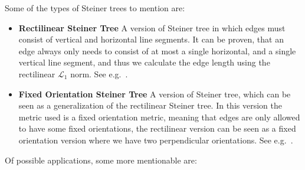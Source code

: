 Some of the types of Steiner trees to mention are:
%
\begin{itemize}
\item \textbf{Rectilinear Steiner Tree} \quad A version of Steiner tree in which
  edges must consist of vertical and horizontal line segments. It can be proven,
  that an edge always only needs to consist of at most a single horizontal, and
  a single vertical line segment, and thus we calculate the edge length using
  the rectilinear $\mathcal{L}_1$ norm. See e.g.~\textcite[ch.~3]{brazil2015}.
\item \textbf{Fixed Orientation Steiner Tree} \quad A version of Steiner tree,
  which can be seen as a generalization of the rectilinear Steiner tree. In this
  version the metric used is a fixed orientation metric, meaning that edges are
  only allowed to have some fixed orientations, the rectilinear version can be
  seen as a fixed orientation version where we have two perpendicular
  orientations. See e.g.~\textcite[ch.~2]{brazil2015}.
\end{itemize}
%
Of possible applications, some more mentionable are:
%
